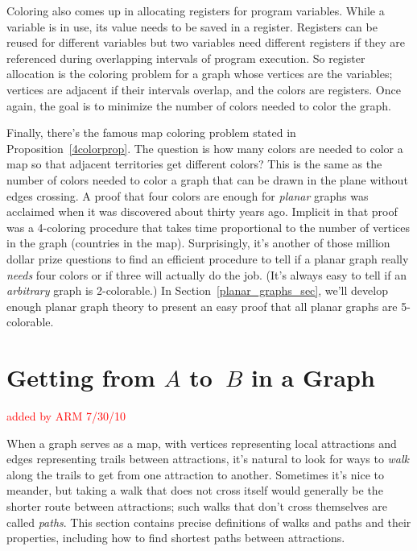 Coloring also comes up in allocating registers for program variables.
While a variable is in use, its value needs to be saved in a register.
Registers can be reused for different variables but two variables need
different registers if they are referenced during overlapping
intervals of program execution.  So register allocation is the
coloring problem for a graph whose vertices are the variables;
vertices are adjacent if their intervals overlap, and the colors are
registers.  Once again, the goal is to minimize the number of colors
needed to color the graph.

Finally, there's the famous map coloring problem stated in
Proposition~\ref{4colorprop}.  The question is how many colors are needed
to color a map so that adjacent territories get different colors?  This is
the same as the number of colors needed to color a graph that can be drawn
in the plane without edges crossing.  A proof that four colors are enough
for  \emph{planar} graphs was acclaimed when it was
discovered about thirty years ago.  Implicit in that proof was a
4-coloring procedure that takes time proportional to the number of
vertices in the graph (countries in the map).  Surprisingly, it's another
of those million dollar prize questions to find an efficient procedure to
tell if a planar graph really \emph{needs} four colors or if three will
actually do the job.  (It's always easy to tell if an \emph{arbitrary}
graph is 2-colorable.)  In Section~\ref{planar_graphs_sec}, we'll develop
enough planar graph theory to present an easy proof that all planar graphs
are 5-colorable.


\section{Getting from $A$ to~$B$ in a Graph}\label{sec:connectedness}
\begin{editingnotes}
\textcolor{red}{added by ARM 7/30/10}
\end{editingnotes}
When a graph serves as a map, with vertices representing local attractions
and edges representing trails between attractions, it's natural to look
for ways to \emph{walk} along the trails to get from one attraction to
another.  Sometimes it's nice to meander, but taking a walk that does not
cross itself would generally be the shorter route between attractions;
such walks that don't cross themselves are called \emph{paths}.  This
section contains precise definitions of walks and paths and their
properties, including how to find shortest paths between attractions.

